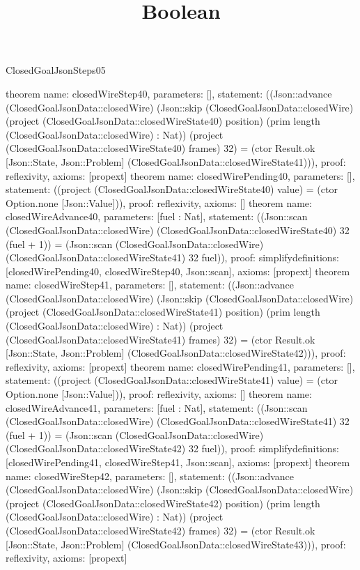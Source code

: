 \begin{lexlean}{ClosedGoalJsonSteps05}
\title{Boolean}
\begin{semanticmodule}
theorem{
 name: closedWireStep40, parameters: [],
 statement: ((Json::advance (ClosedGoalJsonData::closedWire) (Json::skip (ClosedGoalJsonData::closedWire) (project (ClosedGoalJsonData::closedWireState40) position) (prim length (ClosedGoalJsonData::closedWire) : Nat)) (project (ClosedGoalJsonData::closedWireState40) frames) 32) = (ctor Result.ok [Json::State, Json::Problem] (ClosedGoalJsonData::closedWireState41))), proof: reflexivity{}, axioms: [propext]
}
theorem{
 name: closedWirePending40, parameters: [],
 statement: ((project (ClosedGoalJsonData::closedWireState40) value) = (ctor Option.none [Json::Value])), proof: reflexivity{}, axioms: []
}
theorem{
 name: closedWireAdvance40, parameters: [fuel : Nat],
 statement: ((Json::scan (ClosedGoalJsonData::closedWire) (ClosedGoalJsonData::closedWireState40) 32 (fuel + 1)) = (Json::scan (ClosedGoalJsonData::closedWire) (ClosedGoalJsonData::closedWireState41) 32 fuel)), proof: simplify{definitions: [closedWirePending40, closedWireStep40, Json::scan]}, axioms: [propext]
}
theorem{
 name: closedWireStep41, parameters: [],
 statement: ((Json::advance (ClosedGoalJsonData::closedWire) (Json::skip (ClosedGoalJsonData::closedWire) (project (ClosedGoalJsonData::closedWireState41) position) (prim length (ClosedGoalJsonData::closedWire) : Nat)) (project (ClosedGoalJsonData::closedWireState41) frames) 32) = (ctor Result.ok [Json::State, Json::Problem] (ClosedGoalJsonData::closedWireState42))), proof: reflexivity{}, axioms: [propext]
}
theorem{
 name: closedWirePending41, parameters: [],
 statement: ((project (ClosedGoalJsonData::closedWireState41) value) = (ctor Option.none [Json::Value])), proof: reflexivity{}, axioms: []
}
theorem{
 name: closedWireAdvance41, parameters: [fuel : Nat],
 statement: ((Json::scan (ClosedGoalJsonData::closedWire) (ClosedGoalJsonData::closedWireState41) 32 (fuel + 1)) = (Json::scan (ClosedGoalJsonData::closedWire) (ClosedGoalJsonData::closedWireState42) 32 fuel)), proof: simplify{definitions: [closedWirePending41, closedWireStep41, Json::scan]}, axioms: [propext]
}
theorem{
 name: closedWireStep42, parameters: [],
 statement: ((Json::advance (ClosedGoalJsonData::closedWire) (Json::skip (ClosedGoalJsonData::closedWire) (project (ClosedGoalJsonData::closedWireState42) position) (prim length (ClosedGoalJsonData::closedWire) : Nat)) (project (ClosedGoalJsonData::closedWireState42) frames) 32) = (ctor Result.ok [Json::State, Json::Problem] (ClosedGoalJsonData::closedWireState43))), proof: reflexivity{}, axioms: [propext]
}
\end{semanticmodule}
\end{lexlean}
